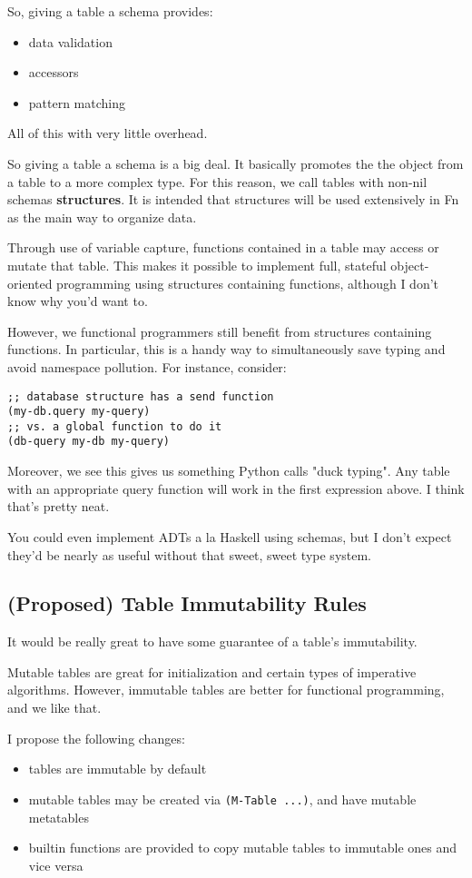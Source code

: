 \documentclass[11pt]{article}
\begin{document}
So, giving a table a schema provides:
\begin{itemize}
\item data validation
\item accessors
\item pattern matching
\end{itemize}
All of this with very little overhead.

So giving a table a schema is a big deal. It basically promotes the the object
from a table to a more complex type. For this reason, we call tables with
non-nil schemas \textbf{structures}. It is intended that structures will be used
extensively in Fn as the main way to organize data.

Through use of variable capture, functions contained in a table may access or
mutate that table. This makes it possible to implement full, stateful
object-oriented programming using structures containing functions, although I
don't know why you'd want to.

However, we functional programmers still benefit from structures containing
functions. In particular, this is a handy way to simultaneously save typing and
avoid namespace pollution. For instance, consider:
\begin{verbatim}
;; database structure has a send function
(my-db.query my-query)
;; vs. a global function to do it
(db-query my-db my-query)
\end{verbatim}
Moreover, we see this gives us something Python calls "duck typing". Any
table with an appropriate query function will work in the first expression
above. I think that's pretty neat.

You could even implement ADTs a la Haskell using schemas, but I don't expect
they'd be nearly as useful without that sweet, sweet type system.


\subsection{(Proposed) Table Immutability Rules}
\label{sec:orge599d70}

It would be really great to have some guarantee of a table's immutability.

Mutable tables are great for initialization and certain types of imperative
algorithms. However, immutable tables are better for functional programming, and
we like that.

I propose the following changes:
\begin{itemize}
\item tables are immutable by default
\item mutable tables may be created via \texttt{(M-Table ...)}, and have mutable metatables
\item builtin functions are provided to copy mutable tables to immutable ones and
vice versa
\end{itemize}
\end{document}
